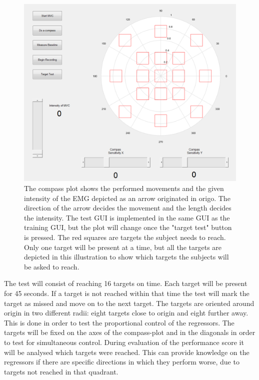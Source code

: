 \begin{figure}[H]
	\includegraphics[width=1\textwidth]{figures/Methods/PlacesToGo.png}  %
	\caption{The compass plot shows the performed movements and the given intensity of the EMG depicted as an arrow originated in origo. The direction of the arrow decides the movement and the length decides the intensity. The test GUI is implemented in the same GUI as the training GUI, but the plot will change once the "target test" button is pressed. The red squares are targets the subject needs to reach. Only one target will be present at a time, but all the targets are depicted in this illustration to show which targets the subjects will be asked to reach.}
	\label{fig:PlacesToGo}
\end{figure}

The test will consist of reaching 16 targets on time. Each target will be present for 45 seconds. If a target is not reached within that time the test will mark the target as missed and move on to the next target. The targets are oriented around origin in two different radii: eight targets close to origin and eight further away. This is done in order to test the proportional control of the regressors. The targets will be fixed on the axes of the compass-plot and in the diagonals in order to test for simultaneous control. 
During evaluation of the performance score it will be analysed which targets were reached. This can provide knowledge on the regressors if there are specific directions in which they perform worse, due to targets not reached in that quadrant. 


%
%
%
